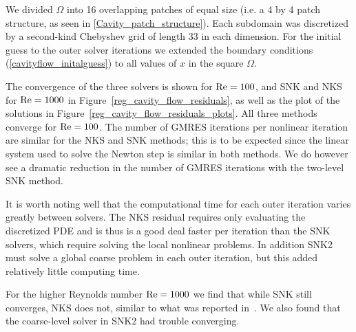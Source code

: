 We divided $\Omega$ into 16 overlapping patches of equal size (i.e. a 4 by 4 patch structure, as seen in \ref{Cavity_patch_structure}). Each subdomain was discretized by a second-kind Chebyshev grid of length 33 in each dimension. For the initial guess to the outer solver iterations we extended the boundary conditions (\ref{cavityflow_initalguess}) to all values of $x$ in the square $\Omega$. 

The convergence of the three solvers is shown for $\text{Re}=100$, and SNK and NKS for $\text{Re} = 1000$ in Figure~\ref{reg_cavity_flow_residuals}, as well as the plot of the solutions in Figure~\ref{reg_cavity_flow_residuals_plots}. All three methods converge for $\text{Re} = 100$. The number of GMRES iterations per nonlinear iteration are similar for the NKS and SNK methods; this is to be expected since the linear system used to solve the Newton step is similar in both methods. We do however see a dramatic reduction in the number of GMRES iterations with the two-level SNK method. 

It is worth noting well that the computational time for each outer iteration varies greatly between solvers. The NKS residual requires only evaluating the discretized PDE and is thus is a good deal faster per iteration than the SNK solvers, which require solving the local nonlinear problems. In addition SNK2 must solve a global coarse problem in each outer iteration, but this added relatively little computing time. 

For the higher Reynolds number $\text{Re} = 1000$ we find that while SNK still converges, NKS does not, similar to what was reported in~\cite{Cai2002}. We also found that the coarse-level solver in SNK2 had trouble converging. 


